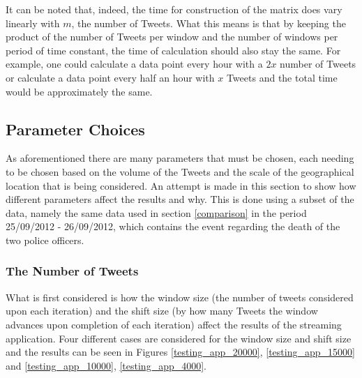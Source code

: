 \documentclass[11pt,a4paper]{article}
\begin{document}
It can be noted that, indeed, the time for construction of the matrix does vary linearly with $m$, the number of Tweets. What this means is that by keeping the product of the number of Tweets per window and the number of windows per period of time constant, the time of calculation should also stay the same. For example, one could calculate a data point every hour with a $2x$ number of Tweets or calculate a data point every half an hour with $x$ Tweets and the total time would be approximately the same.

\subsection{Parameter Choices}

As aforementioned there are many parameters that must be chosen, each needing to be chosen based on the volume of the Tweets and the scale of the geographical location that is being considered. An attempt is made in this section to show how different parameters affect the results and why. This is done using a subset of the data, namely the same data used in section \ref{comparison} in the period 25/09/2012 - 26/09/2012, which contains the event regarding the death of the two police officers.

\subsubsection{The Number of Tweets}
 
What is first considered is how the window size (the number of tweets considered upon each iteration) and the shift size (by how many Tweets the window advances upon completion of each iteration) affect the results of the streaming application. Four different cases are considered for the window size and shift size and the results can be seen in Figures \ref{testing_app_20000}, \ref{testing_app_15000} and \ref{testing_app_10000}, \ref{testing_app_4000}. 
\end{document}
